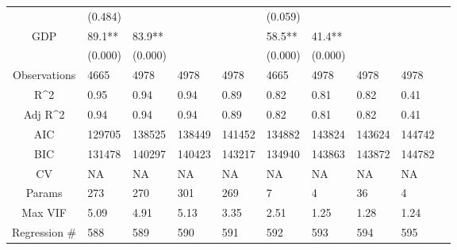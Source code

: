 \documentclass{article}
\begin{document}
\begin{table}[H]
\begin{tabular}{|clllllllll|}
   & (0.484) &  &  &  & (0.059) &  &  &  & \\ 
  GDP & 89.1** & 83.9** &  &  & 58.5** & 41.4** &  &  & \\ 
   & (0.000) & (0.000) &  &  & (0.000) & (0.000) &  &  & \\ 
  \hline 
 Observations & 4665 & 4978 & 4978 & 4978 & 4665 & 4978 & 4978 & 4978 & \\ 
  R^2 & 0.95 & 0.94 & 0.94 & 0.89 & 0.82 & 0.81 & 0.82 & 0.41 & \\ 
  Adj R^2 & 0.94 & 0.94 & 0.94 & 0.89 & 0.82 & 0.81 & 0.82 & 0.41 & \\ 
  AIC & 129705 & 138525 & 138449 & 141452 & 134882 & 143824 & 143624 & 144742 & \\ 
  BIC & 131478 & 140297 & 140423 & 143217 & 134940 & 143863 & 143872 & 144782 & \\ 
  CV & NA & NA & NA & NA & NA & NA & NA & NA & \\ 
  Params & 273 & 270 & 301 & 269 & 7 & 4 & 36 & 4 & \\ 
  Max VIF & 5.09 & 4.91 & 5.13 & 3.35 & 2.51 & 1.25 & 1.28 & 1.24 & \\ 
  Regression \# & 588 & 589 & 590 & 591 & 592 & 593 & 594 & 595 & \\ 
   \hline
\end{tabular}
 
\end{table}
\end{document}
